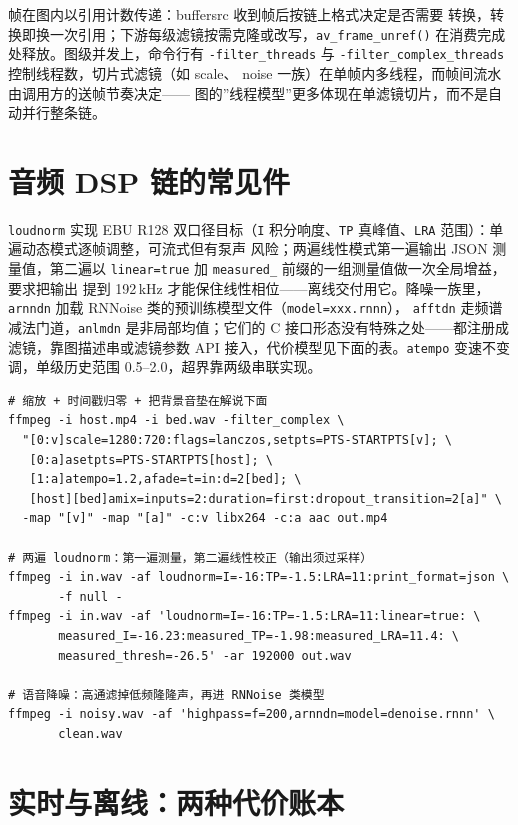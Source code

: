 \documentclass[12pt,a4paper,fontset=fandol]{ctexbook}
\newcommand{\Fn}[1]{\texttt{#1()}}
\newcommand{\Tp}[1]{\texttt{#1}}
\begin{document}
帧在图内以引用计数传递：buffersrc 收到帧后按链上格式决定是否需要
转换，转换即换一次引用；下游每级滤镜按需克隆或改写，\Fn{av\_frame\_unref}
在消费完成处释放。图级并发上，命令行有 \Tp{-filter\_threads} 与
\Tp{-filter\_complex\_threads} 控制线程数，切片式滤镜（如 scale、
noise 一族）在单帧内多线程，而帧间流水由调用方的送帧节奏决定——
图的''线程模型''更多体现在单滤镜切片，而不是自动并行整条链。

\section{音频 DSP 链的常见件}

\Tp{loudnorm} 实现 EBU R128 双口径目标（\Tp{I} 积分响度、\Tp{TP}
真峰值、\Tp{LRA} 范围）：单遍动态模式逐帧调整，可流式但有泵声
风险；两遍线性模式第一遍输出 JSON 测量值，第二遍以
\Tp{linear=true} 加 \Tp{measured\_} 前缀的一组测量值做一次全局增益，要求把输出
提到 192\,kHz 才能保住线性相位——离线交付用它。降噪一族里，
\Tp{arnndn} 加载 RNNoise 类的预训练模型文件（\Tp{model=xxx.rnnn}），
\Tp{afftdn} 走频谱减法门道，\Tp{anlmdn} 是非局部均值；它们的
C 接口形态没有特殊之处——都注册成滤镜，靠图描述串或滤镜参数 API
接入，代价模型见下面的表。\Tp{atempo} 变速不变调，单级历史范围
0.5--2.0，超界靠两级串联实现。

\begin{lstlisting}[style=shellstyle,
  caption={filter\_complex 图：scale、setpts 与 amix 的混排},
  label={lst:ch09-fcomplex}]
# 缩放 + 时间戳归零 + 把背景音垫在解说下面
ffmpeg -i host.mp4 -i bed.wav -filter_complex \
  "[0:v]scale=1280:720:flags=lanczos,setpts=PTS-STARTPTS[v]; \
   [0:a]asetpts=PTS-STARTPTS[host]; \
   [1:a]atempo=1.2,afade=t=in:d=2[bed]; \
   [host][bed]amix=inputs=2:duration=first:dropout_transition=2[a]" \
  -map "[v]" -map "[a]" -c:v libx264 -c:a aac out.mp4

# 两遍 loudnorm：第一遍测量，第二遍线性校正（输出须过采样）
ffmpeg -i in.wav -af loudnorm=I=-16:TP=-1.5:LRA=11:print_format=json \
       -f null -
ffmpeg -i in.wav -af 'loudnorm=I=-16:TP=-1.5:LRA=11:linear=true: \
       measured_I=-16.23:measured_TP=-1.98:measured_LRA=11.4: \
       measured_thresh=-26.5' -ar 192000 out.wav

# 语音降噪：高通滤掉低频隆隆声，再进 RNNoise 类模型
ffmpeg -i noisy.wav -af 'highpass=f=200,arnndn=model=denoise.rnnn' \
       clean.wav
\end{lstlisting}

\section{实时与离线：两种代价账本}
\end{document}
